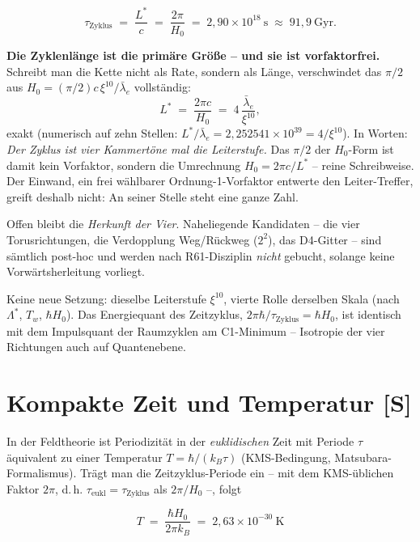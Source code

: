 \begin{equation}
  \tau_\text{Zyklus} \;=\; \frac{L^{*}}{c}
  \;=\; \frac{2\pi}{H_0}
  \;=\; 2{,}90\times10^{18}~\text{s}
  \;\approx\; 91{,}9~\text{Gyr}.
  \label{eq:tauzyk}
\end{equation}

\textbf{Die Zyklenlänge ist die primäre Größe -- und sie ist
vorfaktorfrei.} Schreibt man die Kette nicht als Rate, sondern als
Länge, verschwindet das $\pi/2$ aus $H_0 = (\pi/2)c\,\xi^{10}/
\bar\lambda_e$ vollständig:
\begin{equation}
  L^{*} \;=\; \frac{2\pi c}{H_0}
  \;=\; 4\,\frac{\bar\lambda_e}{\xi^{10}},
  \label{eq:Lstar4}
\end{equation}
exakt (numerisch auf zehn Stellen: $L^{*}/\bar\lambda_e =
2{,}252541\times10^{39} = 4/\xi^{10}$). In Worten: \emph{Der Zyklus
ist vier Kammertöne mal die Leiterstufe.} Das $\pi/2$ der
$H_0$-Form ist damit kein Vorfaktor, sondern die Umrechnung
$H_0 = 2\pi c/L^{*}$ -- reine Schreibweise. Der Einwand, ein frei
wählbarer Ordnung-1-Vorfaktor entwerte den Leiter-Treffer, greift
deshalb nicht: An seiner Stelle steht eine ganze Zahl.

Offen bleibt die \emph{Herkunft der Vier}. Naheliegende
Kandidaten -- die vier Torusrichtungen, die Verdopplung
Weg/Rückweg ($2^2$), das D4-Gitter -- sind sämtlich post-hoc und
werden nach R61-Disziplin \emph{nicht} gebucht, solange keine
Vorwärtsherleitung vorliegt.

Keine neue Setzung: dieselbe Leiterstufe $\xi^{10}$, vierte Rolle
derselben Skala (nach $\Lambda^{*}$, $T_w$, $\hbar H_0$). Das
Energiequant des Zeitzyklus, $2\pi\hbar/\tau_\text{Zyklus}
= \hbar H_0$, ist identisch mit dem Impulsquant der Raumzyklen am
C1-Minimum -- Isotropie der vier Richtungen auch auf Quantenebene.

\section{Kompakte Zeit und Temperatur [S]}

In der Feldtheorie ist Periodizität in der \emph{euklidischen} Zeit
mit Periode $\tau$ äquivalent zu einer Temperatur
$T = \hbar/(k_B\tau)$ (KMS-Bedingung, Matsubara-Formalismus). Trägt
man die Zeitzyklus-Periode ein -- mit dem KMS-üblichen Faktor
$2\pi$, d.\,h. $\tau_\text{eukl} = \tau_\text{Zyklus}$ als
$2\pi/H_0$ --, folgt

\begin{equation}
  \boxed{\;T \;=\; \frac{\hbar H_0}{2\pi k_B}
  \;=\; 2{,}63\times10^{-30}~\text{K}\;}
  \label{eq:tgh}
\end{equation}

